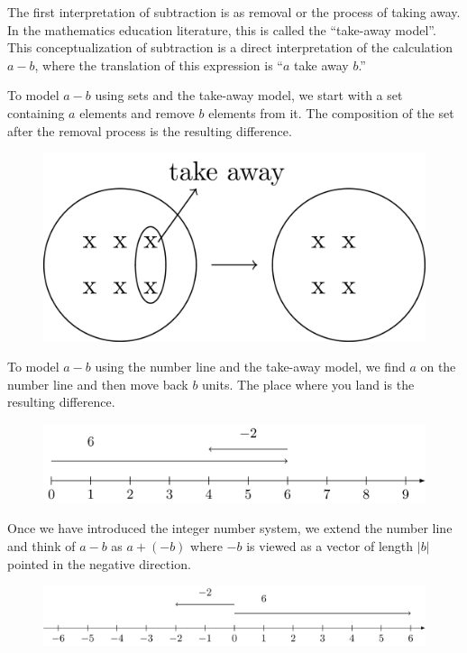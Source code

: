 \documentclass[
]{book}
\theoremstyle{definition}
\theoremstyle{definition}
\theoremstyle{definition}
\theoremstyle{remark}
\begin{document}
The first interpretation of subtraction is as removal or the process of taking away. In the mathematics education literature, this is called the ``take-away model''. This conceptualization of subtraction is a direct interpretation of the calculation \(a-b\), where the translation of this expression is ``\(a\) take away \(b\).''

To model \(a-b\) using sets and the take-away model, we start with a set containing \(a\) elements and remove \(b\) elements from it. The composition of the set after the removal process is the resulting difference.

\begin{figure}

{\centering \includegraphics[width=0.3\linewidth]{tikz/subtraction-model-sets} 

}

\end{figure}

To model \(a-b\) using the number line and the take-away model, we find \(a\) on the number line and then move back \(b\) units. The place where you land is the resulting difference.

\begin{figure}

{\centering \includegraphics[width=0.7\linewidth]{tikz/subtraction-model-numberline} 

}

\end{figure}

Once we have introduced the integer number system, we extend the number line and think of \(a-b\) as \(a+(-b)\) where \(-b\) is viewed as a vector of length \(|b|\) pointed in the negative direction.

\begin{figure}

{\centering \includegraphics[width=0.8\linewidth]{tikz/subtraction-model-numberline2} 

}

\end{figure}
\end{document}
